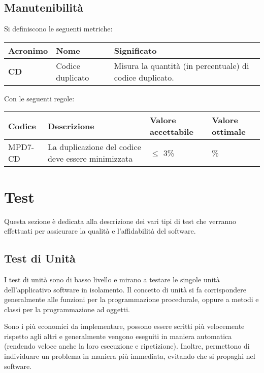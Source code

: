 \subsection{Manutenibilità}
Si definiscono le seguenti metriche:
\begin{table}[h!]
\centering
\def\arraystretch{1.5}
\begin{tabular}{ |m{2cm}|m{5.5cm}|m{6.5cm}| }
\hline
\rowcolor{lightgray!30}
\textbf{Acronimo} & \textbf{Nome} & \textbf{Significato}\\
\hline
\textbf{CD} & Codice duplicato & Misura la quantità (in percentuale) di codice duplicato.\\
\hline
\end{tabular}
\end{table}
\par Con le seguenti regole:
\begin{table}[h!]
\centering
\def\arraystretch{1.5}
\begin{tabular}{ |>{\centering\arraybackslash}m{2.5cm}|>{\centering\arraybackslash}m{5.5cm}|>{\centering\arraybackslash}m{3cm}|>{\centering\arraybackslash}m{3cm}| }
\hline
\rowcolor{black}
\textbf{\color{white} Codice} & \textbf{\color{white} Descrizione} & \textbf{\color{white} Valore accettabile} & \textbf{\color{white} Valore ottimale}\\
\hline
MPD7-CD & La duplicazione del codice deve essere minimizzata & $\leq$ 3\% & 0\% \\
\hline
\end{tabular}
\end{table}

\newpage
\section{Test}
\par Questa sezione è dedicata alla descrizione dei vari tipi di test che verranno effettuati per assicurare la qualità e l'affidabilità del software.

\subsection{Test di Unità}
\par I test di unità sono di basso livello e mirano a testare le singole unità dell'applicativo software in isolamento. Il concetto di unità si fa corrispondere generalmente alle funzioni per la programmazione procedurale, oppure a metodi e classi per la programmazione ad oggetti.
\par Sono i più economici da implementare, possono essere scritti più velocemente rispetto agli altri e generalmente vengono eseguiti in maniera automatica (rendendo veloce anche la loro esecuzione e ripetizione). Inoltre, permettono di individuare un problema in maniera più immediata, evitando che si propaghi nel software.


